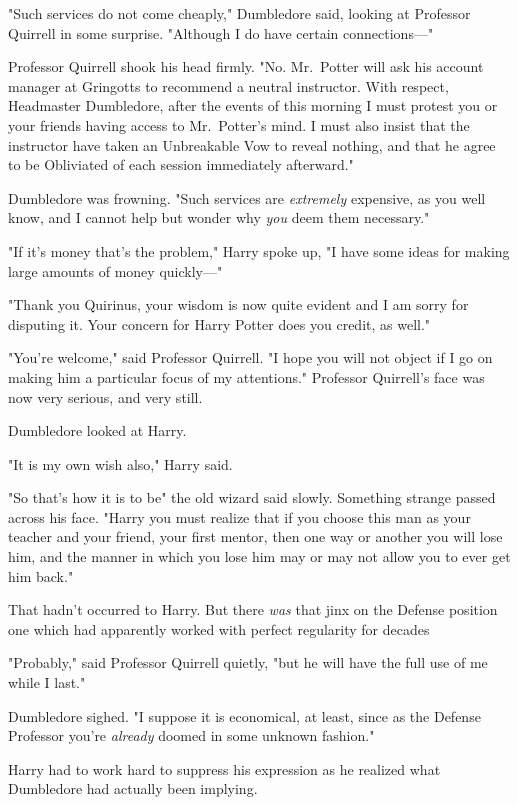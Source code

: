 "Such services do not come cheaply," Dumbledore said, looking at Professor
Quirrell in some surprise. "Although I do have certain connections\mbox{---}"

Professor Quirrell shook his head firmly. "No. Mr.~Potter will ask his account
manager at Gringotts to recommend a neutral instructor. With respect,
Headmaster Dumbledore, after the events of this morning I must protest you or
your friends having access to Mr.~Potter's mind. I must also insist that the
instructor have taken an Unbreakable Vow to reveal nothing, and that he agree
to be Obliviated of each session immediately afterward."

Dumbledore was frowning. "Such services are \emph{extremely} expensive, as you
well know, and I cannot help but wonder why \emph{you} deem them necessary."

"If it's money that's the problem," Harry spoke up, "I have some ideas for
making large amounts of money quickly\mbox{---}"

"Thank you Quirinus, your wisdom is now quite evident and I am sorry for
disputing it. Your concern for Harry Potter does you credit, as well."

"You're welcome," said Professor Quirrell. "I hope you will not object if I go
on making him a particular focus of my attentions." Professor Quirrell's face
was now very serious, and very still.

Dumbledore looked at Harry.

"It is my own wish also," Harry said.

"So that's how it is to be{\el}" the old wizard said slowly. Something
strange passed across his face. "Harry{\el} you must realize that if you
choose this man as your teacher and your friend, your first mentor, then one
way or another you will lose him, and the manner in which you lose him may or
may not allow you to ever get him back."

That hadn't occurred to Harry. But there \emph{was} that jinx on the Defense
position{\el} one which had apparently worked with perfect regularity for
decades{\el}

"Probably," said Professor Quirrell quietly, "but he will have the full use of
me while I last."

Dumbledore sighed. "I suppose it is economical, at least, since as the Defense
Professor you're \emph{already} doomed in some unknown fashion."

Harry had to work hard to suppress his expression as he realized what
Dumbledore had actually been implying.

